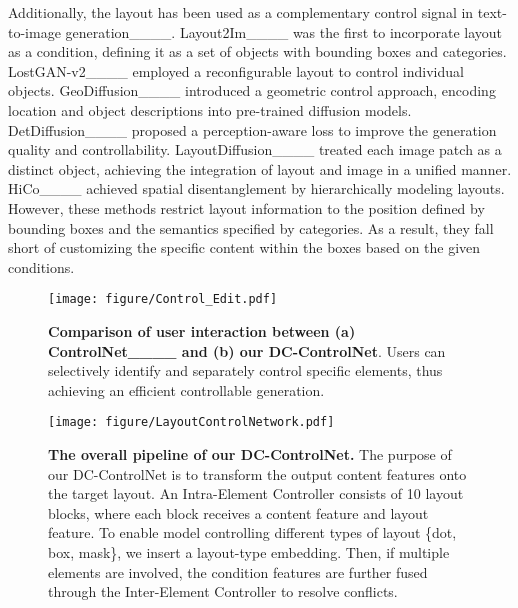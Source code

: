 Additionally, the layout has been used as a complementary control signal in text-to-image generation____. 
Layout2Im____ was the first to incorporate layout as a condition, defining it as a set of objects with bounding boxes and categories. 
%
LostGAN-v2____ employed a reconfigurable layout to control individual objects. 
%
GeoDiffusion____ introduced a geometric control approach, encoding location and object descriptions into pre-trained diffusion models. 
DetDiffusion____ proposed a perception-aware loss to improve the generation quality and controllability.
LayoutDiffusion____ treated each image patch as a distinct object, achieving the integration of layout and image in a unified manner. 
HiCo____ achieved spatial disentanglement by hierarchically modeling layouts.
However, these methods restrict layout information to the position defined by bounding boxes and the semantics specified by categories. As a result, they fall short of customizing the specific content within the boxes based on the given conditions.

\begin{figure}
    \centering
    \texttt{[image: figure/Control\_Edit.pdf]}
    \vspace{-1mm}
    \caption{\textbf{Comparison of user interaction between (a) ControlNet____ and (b) our {DC-ControlNet}}. Users can selectively identify and separately control specific elements, thus achieving an efficient controllable generation.}
    \label{fig:edit}
    \vspace{-6mm}
\end{figure}

\begin{figure*}
    \centering
    \texttt{[image: figure/LayoutControlNetwork.pdf]}
    \caption{\textbf{The overall pipeline of our DC-ControlNet.} The purpose of our DC-ControlNet is to transform the output content features onto the target layout. An Intra-Element Controller consists of 10 layout blocks, where each block receives a content feature and layout feature. To enable model controlling different types of layout \{dot, box, mask\}, we insert a layout-type embedding. Then, if multiple elements are involved, the condition features are further fused through the Inter-Element Controller to resolve conflicts.}
    \label{fig:over-pipeline}
    \vspace{-3mm}
\end{figure*}